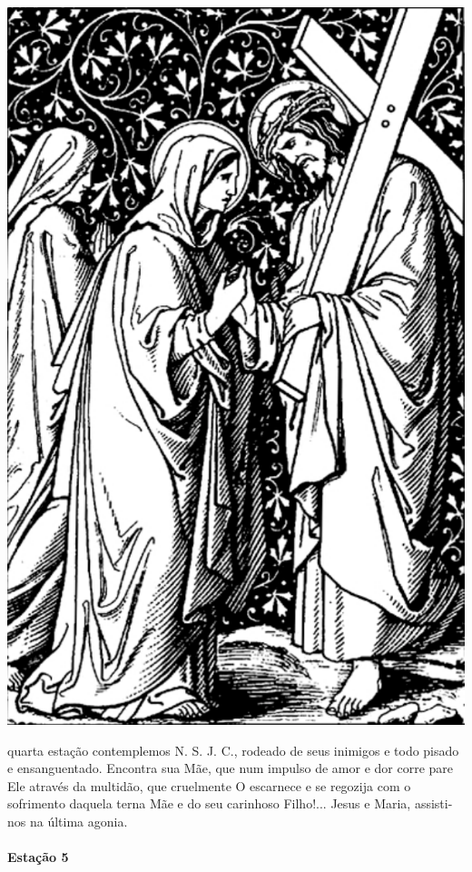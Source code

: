 \begin{nscenter}
\includegraphics[width=.8\textwidth, height=.8\textheight, keepaspectratio]{media/station4}
\end{nscenter}

 quarta estação contemplemos N. S. J. C., rodeado de seus inimigos e todo pisado e ensanguentado. Encontra sua Mãe, que num impulso de amor e dor corre pare Ele através da multidão, que cruelmente O escarnece e se regozija com o sofrimento daquela terna Mãe e do seu carinhoso Filho!...
Jesus e Maria, assisti-nos na última agonia.

\newpage

\paragraph{Estação 5}

